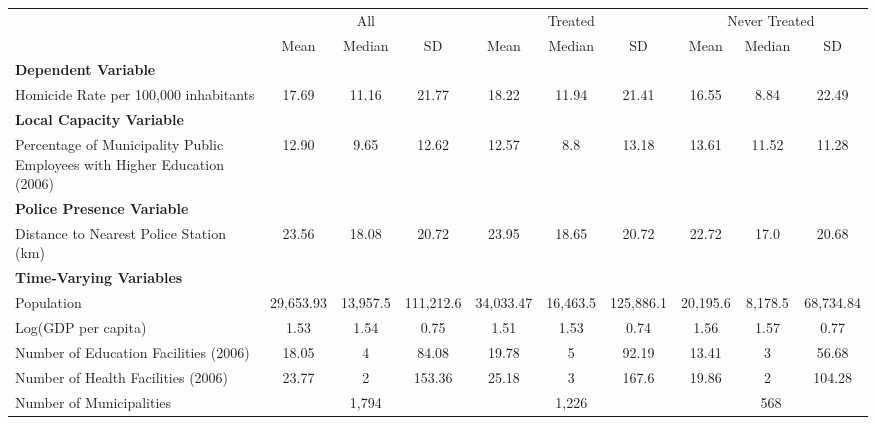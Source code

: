 \documentclass{article}
\begin{document}
\begin{table}[!htbp]
\centering
\begin{adjustbox}{max width=\textwidth}
\begin{tabular}{lccccccccc}
\toprule
& \multicolumn{3}{c}{All} & \multicolumn{3}{c}{Treated} & \multicolumn{3}{c}{Never Treated} \\
\cmidrule(lr){2-4} \cmidrule(lr){5-7} \cmidrule(lr){8-10}
& Mean & Median & SD & Mean & Median & SD & Mean & Median & SD \\
\midrule
\multicolumn{10}{l}{\textbf{Dependent Variable}} \\
Homicide Rate per 100,000 inhabitants & 17.69 & 11.16 & 21.77 & 18.22 & 11.94 & 21.41 & 16.55 & 8.84 & 22.49 \\[0.5em]
\midrule
\multicolumn{10}{l}{\textbf{Local Capacity Variable}} \\
Percentage of Municipality Public Employees with Higher Education (2006) & 12.90 & 9.65 & 12.62 & 12.57 & 8.8 & 13.18 & 13.61 & 11.52 & 11.28 \\[0.5em]
\midrule
\multicolumn{10}{l}{\textbf{Police Presence Variable}} \\
Distance to Nearest Police Station (km) & 23.56 & 18.08 & 20.72 & 23.95 & 18.65 & 20.72 & 22.72 & 17.0 & 20.68 \\[0.5em]
\midrule
\multicolumn{10}{l}{\textbf{Time-Varying Variables}} \\
Population & 29,653.93 & 13,957.5 & 111,212.6 & 34,033.47 & 16,463.5 & 125,886.1 & 20,195.6 & 8,178.5 & 68,734.84 \\
Log(GDP per capita) & 1.53 & 1.54 & 0.75 & 1.51 & 1.53 & 0.74 & 1.56 & 1.57 & 0.77 \\
Number of Education Facilities (2006) & 18.05 & 4 & 84.08 & 19.78 & 5 & 92.19 & 13.41 & 3 & 56.68 \\
Number of Health Facilities (2006) & 23.77 & 2 & 153.36 & 25.18 & 3 & 167.6 & 19.86 & 2 & 104.28 \\
\midrule
Number of Municipalities & \multicolumn{3}{c}{1,794} & \multicolumn{3}{c}{1,226} & \multicolumn{3}{c}{568} \\
\bottomrule
\end{tabular}
\end{adjustbox}
\end{table}
\end{document}
